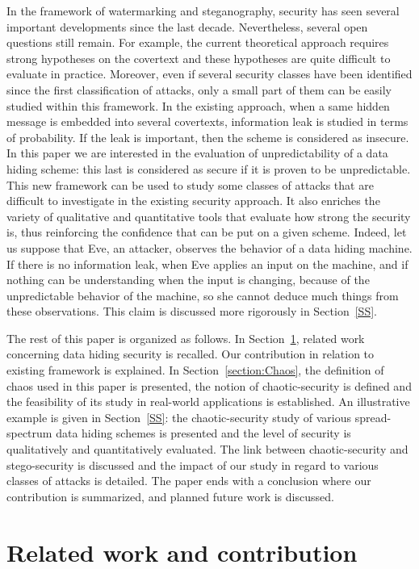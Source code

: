 \documentclass{llncs}
\begin{document}
In the framework of watermarking and steganography, security has seen several important developments since the last decade. Nevertheless, several open questions still remain. For example, the current theoretical approach requires strong hypotheses on the covertext and these hypotheses are quite difficult to evaluate in practice. Moreover, even if several security classes have been identified since the first classification of attacks, only a small part of them can be easily studied within this framework. In the existing approach, when a same hidden message is embedded into several covertexts, information leak is studied in terms of probability. If the leak is important, then the scheme is considered as insecure. In this paper we are interested in the evaluation of unpredictability of a data hiding scheme: this last is considered as secure if it is proven to be unpredictable. This new framework can be used to study some classes of attacks that are difficult to investigate in the existing security approach. It also enriches the variety of qualitative and quantitative tools that evaluate how strong the security is, thus reinforcing the confidence that can be put on a given scheme. Indeed, let us suppose that Eve, an attacker, observes the behavior of a data hiding machine. If there is no information leak, when Eve applies an input on the machine, and if nothing can be understanding when the input is changing, because of the unpredictable behavior of the machine, so she cannot deduce much things from these observations. This claim is discussed more rigorously in Section~\ref{SS}.




The rest of this paper is organized as follows. In Section~\ref{Refs}, related work concerning data hiding security is recalled. Our contribution in relation to existing framework is explained. In Section~\ref{section:Chaos}, the definition of chaos used in this paper is presented, the notion of chaotic-security is defined and the feasibility of its study in real-world applications is established. An illustrative example is given in Section~\ref{SS}: the chaotic-security study of various spread-spectrum data hiding schemes is presented and the level of security is qualitatively and quantitatively evaluated. The link between chaotic-security and stego-security is discussed and the impact of our study in regard to various classes of attacks is detailed. The paper ends with a conclusion where our contribution is summarized, and planned future work is discussed.


\section{Related work and contribution}
\label{Refs}
\end{document}
